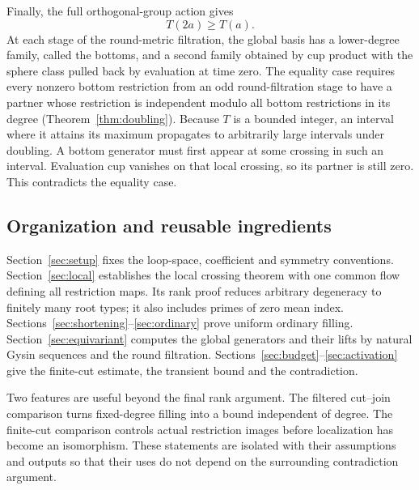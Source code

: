 Finally, the full orthogonal-group action gives
\[
                         T(2a)\ge T(a).
\]
At each stage of the round-metric filtration, the global basis has a
lower-degree family, called the bottoms, and a second family obtained by
cup product with the sphere class pulled back by evaluation at time zero.
The equality case requires every nonzero bottom restriction from an odd
round-filtration stage to have a partner whose restriction is independent
modulo all bottom restrictions in its degree
(Theorem~\ref{thm:doubling}). Because $T$ is a bounded
integer, an interval where it attains its maximum propagates to arbitrarily
large intervals under doubling. A bottom generator must first appear at
some crossing in such an interval. Evaluation cup vanishes on that local
crossing, so its partner is still zero. This contradicts the equality case.

\subsection{Organization and reusable ingredients}

Section~\ref{sec:setup} fixes the loop-space, coefficient and symmetry
conventions. Section~\ref{sec:local} establishes the local crossing theorem with one
common flow defining all restriction maps. Its rank proof reduces arbitrary
degeneracy to finitely many root types; it also includes primes of zero mean
index. Sections~\ref{sec:shortening}--\ref{sec:ordinary} prove uniform ordinary
filling. Section~\ref{sec:equivariant} computes the global generators and
their lifts by natural Gysin sequences and the round filtration.
Sections~\ref{sec:budget}--\ref{sec:activation} give the finite-cut estimate,
the transient bound and the contradiction.

Two features are useful beyond the final rank argument. The filtered
cut--join comparison turns fixed-degree filling into a bound independent
of degree. The finite-cut comparison controls
actual restriction images before localization has become an isomorphism.
These statements are isolated with their assumptions and outputs so that
their uses do not depend on the surrounding contradiction argument.
